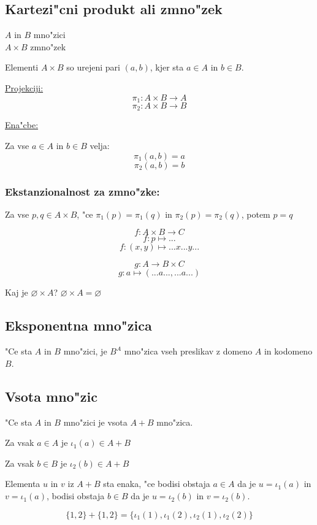 \subsection{Kartezi"cni produkt ali zmno"zek}
\(A\) in \(B\) mno"zici\\
\(A \times B\) zmno"zek

Elementi \(A \times B\) so urejeni pari \((a, b)\), kjer sta \(a \in A\) in \(b \in B\).

\underline{Projekciji:}
\[\pi_1: A \times B \rightarrow A\]
\[\pi_2: A\times B \rightarrow B \]

\underline{Ena"cbe:}

Za vse \(a \in A\) in \(b \in B\) velja:
\[\pi_1(a, b) = a\]
\[\pi_2(a, b) = b\]

\subsubsection*{Ekstanzionalnost za zmno"zke:} Za vse \(p, q \in A \times B\), "ce \(\pi_1(p) = \pi_1(q)\) in \(\pi_2(p) = \pi_2(q)\),  potem \(p = q\)

\[f: A \times B \rightarrow C\]
\[f: p \mapsto ...\]
\[f: (x, y) \mapsto ... x ... y ...\]

\[g: A \rightarrow B \times C\]
\[g: a \mapsto (...a..., ...a...)\]

Kaj je \(\varnothing \times A\)? \(\varnothing \times A = \varnothing\)


\subsection{Eksponentna mno"zica}
"Ce sta \(A\) in \(B\) mno"zici, je \(B^A\) mno"zica vseh preslikav z domeno \(A\) in kodomeno \(B\).

\subsection{Vsota mno"zic}
"Ce sta \(A\) in \(B\) mno"zici je vsota \(A + B\) mno"zica.

Za vsak \(a \in A\) je \(\iota_1(a) \in A + B\)

Za vsak \(b \in B \) je \(\iota_2(b) \in A + B\)

Elementa \(u\) in \(v\) iz \(A + B\) sta enaka, "ce bodisi obstaja \(a \in A\) da je \(u = \iota_1(a)\) in \(v = \iota_1(a)\), bodisi obstaja \(b \in B\) da je \(u = \iota_2(b)\) in \(v = \iota_2(b)\).

\[\{1, 2\} + \{1, 2\} = \{\iota_1(1), \iota_1(2), \iota_2(1), \iota_2(2)\}\]

